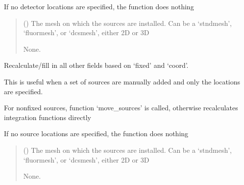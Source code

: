 \documentclass[letterpaper,10pt,english]{sphinxmanual}
\begin{document}
\begin{fulllineitems}
\begin{fulllineitems}
\sphinxAtStartPar
If no detector locations are specified, the function does nothing
\begin{quote}\begin{description}
\sphinxAtStartPar
{} () \textendash{} The mesh on which the sources are installed. Can be a ‘stndmesh’, ‘fluormesh’, or ‘dcsmesh’, either 2D or 3D

\sphinxAtStartPar
None.

\end{description}\end{quote}

\end{fulllineitems}


\begin{fulllineitems}
\label{\detokenize{_autosummary/nirfasterff.base.optodes.optode:nirfasterff.base.optodes.optode.touch_sources}}
\pysigstartsignatures
{}
\pysigstopsignatures
\sphinxAtStartPar
Recalculate/fill in all other fields based on ‘fixed’ and ‘coord’.

\sphinxAtStartPar
This is useful when a set of sources are manually added and only the locations are specified.

\sphinxAtStartPar
For non\sphinxhyphen{}fixed sources, function ‘move\_sources’ is called, otherwise recalculates integration functions directly

\sphinxAtStartPar
If no source locations are specified, the function does nothing
\begin{quote}\begin{description}
\sphinxAtStartPar
{} () \textendash{} The mesh on which the sources are installed. Can be a ‘stndmesh’, ‘fluormesh’, or ‘dcsmesh’, either 2D or 3D

\sphinxAtStartPar
None.

\end{description}\end{quote}

\end{fulllineitems}


\end{fulllineitems}
\end{document}
